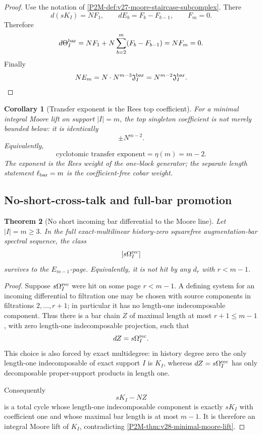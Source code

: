 \documentclass[11pt]{article}
\newtheorem{theorem}{Theorem}[section]
\newtheorem{corollary}[theorem]{Corollary}
\theoremstyle{remark}
\begin{document}
\begin{proof}
Use the notation of
\cref{P2M-def:v27-moore-staircase-subcomplex}.  There
\[
 d(sK_I)=NF_1,
 \qquad
 dE_b=F_b-F_{b-1},
 \qquad
 F_m=0.
\]
Therefore
\[
 d\Theta_I^{\rm bar}
 =
 NF_1+
 N\sum_{b=2}^{m}(F_b-F_{b-1})
 =
 NF_m=0.
\]
Finally
\[
 N E_m
 =
 N\cdot N^{m-3}\mathfrak J_I^{\rm bar}
 =
 N^{m-2}\mathfrak J_I^{\rm bar}.
\]
\end{proof}

\begin{corollary}[Transfer exponent is the Rees top coefficient]
\label{P2M-cor:v28-transfer-minimal-saturation}
For a minimal integral Moore lift on support \(|I|=m\), the top singleton
coefficient is not merely bounded below: it is identically
\[
 \boxed{\pm N^{m-2}.}
\]
Equivalently,
\[
 \boxed{
 \text{cyclotomic transfer exponent}
 =
 \eta(m)
 =
 m-2.}
\]
The exponent is the Rees weight of the one-block generator; the separate
length statement \(\ell_{\rm bar}=m\) is the coefficient-free cobar weight.
\end{corollary}

\subsection{No-short-cross-talk and full-bar promotion}


\begin{theorem}[No short incoming bar differential to the Moore line]
\label{P2M-thm:v28-no-short-cross-talk}
Let \(|I|=m\ge3\).  In the full exact-multilinear history-zero squarefree
augmentation-bar spectral sequence, the class
\[
 [s\Omega_I^{\rm rec}]
\]
survives to the \(E_{m-1}\)-page.  Equivalently, it is not hit by any
\(d_r\) with \(r<m-1\).
\end{theorem}

\begin{proof}
Suppose \(s\Omega_I^{\rm rec}\) were hit on some page \(r<m-1\).
A defining system for an incoming differential to filtration one may be
chosen with source components in filtrations \(2,\ldots,r+1\); in particular
it has no length-one indecomposable component.  Thus there is a bar chain
\(Z\) of maximal length at most \(r+1\le m-1\), with zero length-one
indecomposable projection, such that
\[
 dZ=s\Omega_I^{\rm rec}.
\]
This choice is also forced by exact multidegree: in history degree zero the
only length-one indecomposable of exact support \(I\) is \(K_I\), whereas
\(dZ=s\Omega_I^{\rm rec}\) has only decomposable proper-support products in
length one.

Consequently
\[
 sK_I-NZ
\]
is a total cycle whose length-one indecomposable component is exactly
\(sK_I\) with coefficient one and whose maximal bar length is at most \(m-1\).  It is therefore an integral
Moore lift of \(K_I\), contradicting
\cref{P2M-thm:v28-minimal-moore-lift}.
\end{proof}
\end{document}

